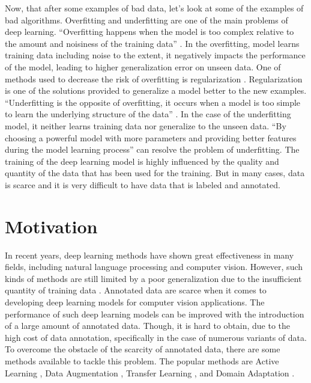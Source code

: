 Now, that after some examples of bad data, let's look at some of the examples of bad algorithms. Overfitting and underfitting are one of the main problems of deep learning. ``Overfitting happens when the model is too complex relative to the amount and noisiness of the training data'' \cite{10.5555/3153997}. In the overfitting, model learns training data including noise to the extent, it negatively impacts the performance of the model, leading to higher generalization error on unseen data. One of methods used to decrease the risk of overfitting is regularization \cite{kukacka2017regularization}. Regularization is one of the solutions provided to generalize a model better to the new examples. ``Underfitting is the opposite of overfitting, it occurs when a model is too simple to learn the underlying structure of the data'' \cite{10.5555/3153997}. In the case of the underfitting model, it neither learns training data nor generalize to the unseen data. ``By choosing a powerful model with more parameters and providing better features during the model learning process'' \cite{10.5555/3153997} can resolve the problem of underfitting. The training of the deep learning model is highly influenced by the quality and quantity of the data that has been used for the training. But in many cases, data is scarce and it is very difficult to have data that is labeled and annotated. 





\section{Motivation}\label{motivation}

In recent years, deep learning methods have shown great effectiveness in many fields, including natural language processing and computer vision. However, such kinds of methods are still limited by a poor generalization due to the insufficient quantity of training data \cite{8978087}. Annotated data are scarce when it comes to developing deep learning models for computer vision applications. The performance of such deep learning models can be improved with the introduction of a large amount of annotated data. Though, it is hard to obtain, due to the high cost of data annotation, specifically in the case of numerous variants of data. To overcome the obstacle of the scarcity of annotated data, there are some methods available to tackle this problem. The popular methods are Active Learning \cite{hemmer2020deal}, Data Augmentation \cite{Shorten.2019}, Transfer Learning \cite{zhuang2020comprehensive}, and Domain Adaptation \cite{redko2020survey}. 

